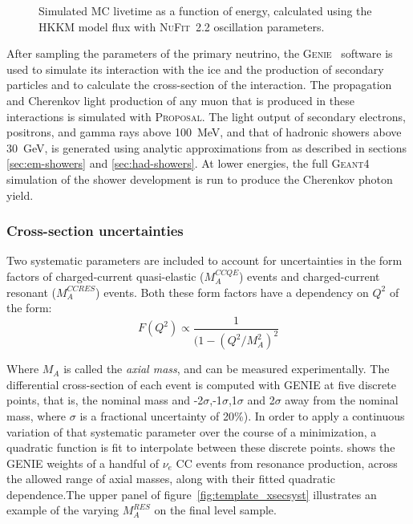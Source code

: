 \begin{figure}
    \centering
    
    \caption{Simulated MC livetime as a function of energy, calculated using the HKKM model flux with \textsc{NuFit}~2.2\cite{nufit22} oscillation parameters.}
    \label{fig:sim-livetime}
\end{figure}

After sampling the parameters of the primary neutrino, the \textsc{Genie}~ software is used to simulate its interaction with the ice and the production of secondary particles and to calculate the cross-section of the interaction. The propagation and Cherenkov light production of any muon that is produced in these interactions is simulated with \textsc{Proposal}. The light output of secondary electrons, positrons, and gamma rays above 100~MeV, and that of hadronic showers above 30~GeV, is generated using analytic approximations from \cite{RADEL2013102} as described in sections \ref{sec:em-showers} and \ref{sec:had-showers}. At lower energies, the full \textsc{Geant4} simulation of the shower development is run to produce the Cherenkov photon yield.

\subsubsection{Cross-section uncertainties}
\label{sec:xsec_systs}
Two systematic parameters are included to account for uncertainties in the form factors of charged-current quasi-elastic ($M_{A}^{CCQE}$) events and charged-current resonant ($M_{A}^{CCRES}$) events. Both these form factors have a dependency on $Q^2$ of the form:\\

\begin{equation}
    F(Q^{2}) \propto \frac{1}{(1-(Q^{2}/M_{A}^{2})^{2}}
\end{equation}

Where $M_{A}$ is called the \textit{axial mass}, and can be measured experimentally.  The differential cross-section of each event is computed with \textsc{GENIE} at five discrete points, that is, the nominal mass and  -2$\sigma$,-1$\sigma$,1$\sigma$ and 2$\sigma$ away from the nominal mass, where $\sigma$ is a fractional uncertainty of 20\%). In order to apply a continuous variation of that systematic parameter over the course of a minimization, a quadratic function is fit to interpolate between these discrete points.   shows the \textsc{GENIE} weights of a handful of $\nu_{e}$ CC events from resonance production, across the allowed range of axial masses, along with their fitted quadratic dependence.The upper panel of figure~\ref{fig:template_xsecsyst} illustrates an example of the varying $M_{A}^{RES}$ on the final level sample.

